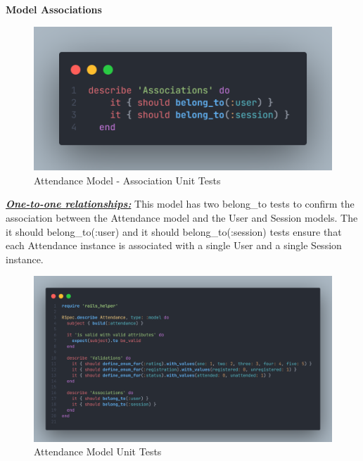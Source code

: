 \begin{justify}
\vspace{0.25cm}
\newendline
\textbf{Model Associations}

    \begin{figure}[H]
        \centerline{\includegraphics[width=140mm,scale=1]{figures/implementation_and_testing/testing/AUT/attendance/associations.png}}
        \caption{Attendance Model - Association Unit Tests}
        \label{Attendance Model - Association Unit Tests}
    \end{figure}

\vspace{0.25cm}
\noindent\textbf{\textit{\underline{One-to-one relationships:}}} This model has two belong\_to tests to confirm the association between the Attendance model and the User and Session models. The it { should belong\_to(:user) } and it { should belong\_to(:session) } tests ensure that each Attendance instance is associated with a single User and a single Session instance.


    \begin{figure}[H]
        \centerline{\includegraphics[width=140mm,scale=1]{figures/implementation_and_testing/testing/AUT/attendance/all.png}}
        \caption{Attendance Model Unit Tests}
        \label{Attendance Model Unit Tests}
    \end{figure}


\end{justify}
